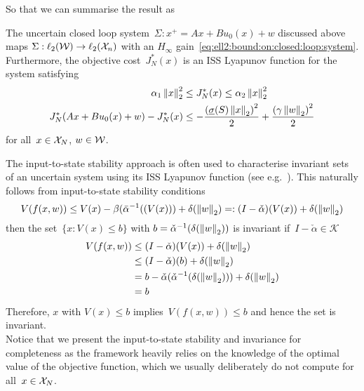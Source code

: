 %
So that we can summarise the result as
%
\begin{thm}\label{thm:stability:statement}
The uncertain closed loop system~$\Sigma:x^+=Ax+Bu_0(x)+w$ discussed above maps $\Sigma:\ell_2(\mathcal W)\rightarrow\ell_2(\mathcal X_n)$ with an $H_\infty$ gain~\eqref{eq:ell2:bound:on:closed:loop:system}.
%
\\[1em]
%
Furthermore, the objective cost~$J_N^\ast(x)$ is an ISS Lyapunov function for the system satisfying
%
\begin{equation}
	\begin{aligned}
	\alpha_1\left\|x\right\|_2^2&\leq J_N^\ast(x)\leq\alpha_2\left\|x\right\|_2^2\\
	J_N^\ast(Ax+Bu_0(x)+w)-J_N^\ast(x)&\leq -\frac{\left(\underline\sigma(S)\left\|x\right\|_2\right)^2}{2} + \frac{\left(\gamma\left\|w\right\|_2\right)^2}{2}
	\end{aligned}
\end{equation}
for all~$x\in\mathcal X_N$, $w\in\mathcal W$.
\end{thm}
%
\noindent The input-to-state stability approach is often used to characterise invariant sets of an uncertain system using its ISS Lyapunov function (see e.g.~\cite{Jiang:2002}).
%
This naturally follows from input-to-state stability conditions
%
\[
V(f(x,w))\leq V(x)-\beta(\bar\alpha^{-1}((V(x)))+\delta(\left\|w\right\|_2) =: (I-\check\alpha)(V(x))+\delta(\left\|w\right\|_2)
\]
%
then the set~$\{x:V(x)\leq b\}$ with $b=\check\alpha^{-1}(\delta(\left\|w\right\|_2))$ is invariant if~$I-\check\alpha\in\mathscr K$
%
\[
\begin{aligned}
V(f(x,w))&\leq (I-\check\alpha)(V(x))+\delta(\left\|w\right\|_2)\\
&\leq (I-\check\alpha)(b)+\delta(\left\|w\right\|_2)\\
&= b-\check\alpha(\check\alpha^{-1}(\delta(\left\|w\right\|_2)))+\delta(\left\|w\right\|_2)\\
&=b
\end{aligned}
\]
%
Therefore, $x$ with $V(x)\leq b$ implies~$V(f(x,w))\leq b$ and hence the set is invariant.
%
\\[1em]
%
Notice that we present the input-to-state stability and invariance for completeness as the framework heavily relies on the knowledge of the optimal value of the objective function, which we usually deliberately do not compute for all~$x\in\mathcal X_N$.
%
%
%
%
%
%
%
